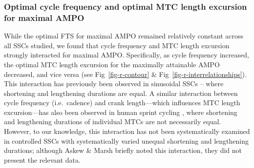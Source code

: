 \documentclass[
  10pt,
  letterpaper,
]{article}
\begin{document}
\subsubsection{Optimal cycle frequency and optimal MTC length excursion
for maximal
AMPO}\label{optimal-cycle-frequency-and-optimal-mtc-length-excursion-for-maximal-ampo}

While the optimal FTS for maximal AMPO remained relatively constant
across all SSCs studied, we found that cycle frequency and MTC length
excursion strongly interacted for maximal AMPO. Specifically, as cycle
frequency increased, the optimal MTC length excursion for the maximally
attainable AMPO decreased, and vice versa (see Fig~\ref{fig-r-contour}
\& Fig~\ref{fig-r-interrelationships}). This interaction has previously
been observed in sinusoidal SSCs \citep[e.g.][]{james_isometric_1996} --
where shortening and lengthening durations are equal. A similar
interaction between cycle frequency (i.e.~cadence) and crank
length---which influences MTC length excursion---has also been observed
in human sprint cycling \citep[e.g.][]{martin_determinants_2001}, where
shortening and lengthening durations of individual MTCs are not
necessarily equal. However, to our knowledge, this interaction has not
been systematically examined in controlled SSCs with systematically
varied unequal shortening and lengthening durations; although {Askew \&
Marsh \citep{askew_effects_1997}} briefly noted this interaction, they
did not present the relevant data.
\end{document}
